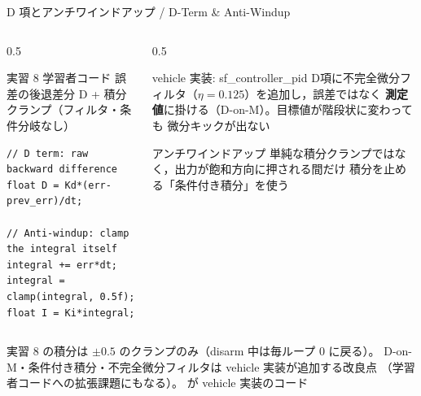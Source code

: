 \begin{frame}[fragile]{D 項とアンチワインドアップ / D-Term \& Anti-Windup}
  \begin{columns}[T]
    \begin{column}{0.5\textwidth}
      \begin{block}{実習 8 学習者コード}\scriptsize
        誤差の後退差分 D + 積分クランプ（フィルタ・条件分岐なし）
      \end{block}
      \begin{lstlisting}[style=sfcpp, basicstyle=\ttfamily\scriptsize]
// D term: raw backward difference
float D = Kd*(err-prev_err)/dt;

// Anti-windup: clamp the integral itself
integral += err*dt;
integral = clamp(integral, 0.5f);
float I = Ki*integral;
      \end{lstlisting}
    \end{column}
    \begin{column}{0.5\textwidth}
      \begin{alertblock}{vehicle 実装: sf\_controller\_pid}\scriptsize
        D項に不完全微分フィルタ（$\eta=0.125$）を追加し，誤差ではなく
        \textbf{測定値}に掛ける（D-on-M）。目標値が階段状に変わっても
        微分キックが出ない
      \end{alertblock}
      \begin{exampleblock}{アンチワインドアップ}\scriptsize
        単純な積分クランプではなく，出力が飽和方向に押される間だけ
        積分を止める「条件付き積分」を使う
      \end{exampleblock}
    \end{column}
  \end{columns}

  {\scriptsize 実習 8 の積分は $\pm0.5$ のクランプのみ（disarm 中は毎ループ 0 に戻る）。
  D-on-M・条件付き積分・不完全微分フィルタは vehicle 実装が追加する改良点
  （学習者コードへの拡張課題にもなる）。
  が vehicle 実装のコード}
\end{frame}

